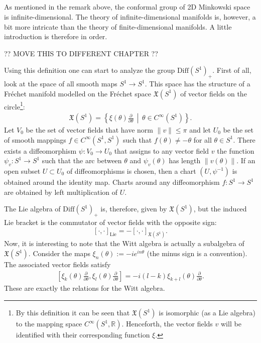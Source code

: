 \subsection{}

    As mentioned in the remark above, the conformal group of 2D Minkowski space is infinite-dimensional. The theory of infinite-dimensional manifolds is, however, a bit more intricate than the theory of finite-dimensional manifolds. A little introduction is therefore in order.

    ?? MOVE THIS TO DIFFERENT CHAPTER ??


    Using this definition one can start to analyze the group $\mathrm{Diff}(S^1)_+$. First of all, look at the space of all smooth maps $S^1\rightarrow S^1$. This space has the structure of a Fr\'echet manifold modelled on the Fr\'echet space $\mathfrak{X}(S^1)$ of vector fields on the circle\footnote{By this definition it can be seen that $\mathfrak{X}(S^1)$ is isomorphic (as a Lie algebra) to the mapping space $C^\infty(S^1,\mathbb{R})$. Henceforth, the vector fields $v$ will be identified with their corresponding function $\xi$.}:
    \begin{gather}
        \mathfrak{X}(S^1) = \left\{\xi(\theta)\frac{\partial}{\partial\theta}\,\middle\vert\,\theta\in C^\infty(S^1)\right\}.
    \end{gather}
    Let $V_0$ be the set of vector fields that have norm $\|v\|\leq\pi$ and let $U_0$ be the set of smooth mappings $f\in C^\infty(S^1,S^1)$ such that $f(\theta)\neq-\theta$ for all $\theta\in S^1$. There exists a diffeomorphism $\psi:V_0\rightarrow U_0$ that assigns to any vector field $v$ the function $\psi_v:S^1\rightarrow S^1$ such that the arc between $\theta$ and $\psi_v(\theta)$ has length $\|v(\theta)\|$. If an open subset $U\subset U_0$ of diffeomorphisms is chosen, then a chart $(U,\psi^{-1})$ is obtained around the identity map. Charts around any diffeomorphism $f:S^1\rightarrow S^1$ are obtained by left multiplication of $U$.

    The Lie algebra of $\mathrm{Diff}(S^1)_+$ is, therefore, given by $\mathfrak{X}(S^1)$, but the induced Lie bracket is the commutator of vector fields with the opposite sign: \[[\cdot,\cdot]_\mathrm{Lie} = -[\cdot,\cdot]_{\mathfrak{X}(S^1)}.\] Now, it is interesting to note that the Witt algebra is actually a subalgebra of $\mathfrak{X}(S^1)$. Consider the maps $\xi_n(\theta):=-ie^{in\theta}$ (the minus sign is a convention). The associated vector fields satisfy
    \begin{gather}
        \left[\xi_k(\theta)\frac{\partial}{\partial\theta}, \xi_l(\theta)\frac{\partial}{\partial\theta}\right] = -i(l-k)\xi_{k+l}(\theta)\frac{\partial}{\partial\theta}.
    \end{gather}
    These are exactly the relations for the Witt algebra.

